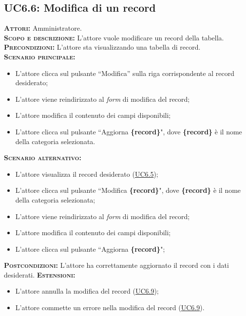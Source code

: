 \subsection{UC6.6: Modifica di un record}
\label{sec:UC66}
\textsc{\textbf{Attori:}} Amministratore.\\
\textsc{\textbf{Scopo e descrizione:}} L'attore vuole modificare un record della tabella.\\
\textsc{\textsc{\textbf{Precondizioni:}}} L'attore sta visualizzando una tabella di record.\\
\textsc{\textbf{Scenario principale:}}
\begin{itemize}
    \item L'attore clicca sul pulsante ``Modifica'' sulla riga corrispondente al record desiderato;
    \item L'attore viene reindirizzato al \textit{form} di modifica del record;
    \item L'attore modifica il contenuto dei campi disponibili;
    \item L'attore clicca sul pulsante ``Aggiorna \textbf{\{record\}}", dove \textbf{\{record\}} è il nome della categoria selezionata.
\end{itemize}
\textsc{\textbf{Scenario alternativo:}}
\begin{itemize}
    \item L'attore visualizza il record desiderato (\hyperref[sec:UC65]{UC6.5});
    \item L'attore clicca sul pulsante ``Modifica \textbf{\{record\}}", dove \textbf{\{record\}} è il nome della categoria selezionata;
    \item L'attore viene reindirizzato al \textit{form} di modifica del record;
    \item L'attore modifica il contenuto dei campi disponibili;
    \item L'attore clicca sul pulsante ``Aggiorna \textbf{\{record\}}";
\end{itemize}
\textsc{\textbf{Postcondizioni:}} L'attore ha correttamente aggiornato il record con i dati desiderati.
\textsc{\textbf{Estensioni:}} \begin{itemize}
    \item L'attore annulla la modifica del record (\hyperref[sec:UC69]{UC6.9});
    \item L'attore commette un errore nella modifica del record (\hyperref[sec:UC69]{UC6.9}).
\end{itemize}

